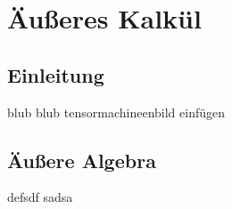 \chapter{Äußeres Kalkül}

\section{Einleitung}
  
  blub blub
  tensormachineenbild einfügen

\section{Äußere Algebra}
  defsdf
  \newpage
  sadsa
